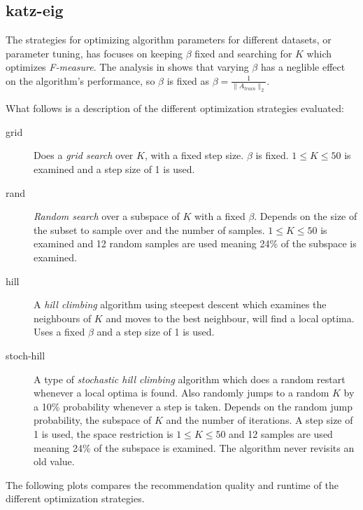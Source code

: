 
\subsection{katz-eig}\label{sec:opt:katzeig}

The strategies for optimizing algorithm parameters for different datasets, or parameter tuning, has focuses on keeping $\beta$ fixed and searching for $K$ which optimizes \textit{F-measure}. The analysis in  shows that varying $\beta$ has a neglible effect on the algorithm's performance, so $\beta$ is fixed as $\beta = \frac{1}{\|A_{train}\|_2}$.

What follows is a description of the different optimization strategies evaluated:

\begin{description}
    \item[grid]
        Does a \textit{grid search} over $K$, with a fixed step size. $\beta$ is fixed. $1 \leq K \leq 50$ is examined and a step size of 1 is used.
    \item[rand]
        \textit{Random search} over a subspace of $K$ with a fixed $\beta$. Depends on the size of the subset to sample over and the number of samples. $1 \leq K \leq 50$ is examined and 12 random samples are used meaning 24\% of the subspace is examined.
    \item[hill]
        A \textit{hill climbing} algorithm using steepest descent which examines the neighbours of $K$ and moves to the best neighbour, will find a local optima. Uses a fixed $\beta$ and a step size of 1 is used.
    \item[stoch-hill]
        A type of \textit{stochastic hill climbing} algorithm which does a random restart whenever a local optima is found. Also randomly jumps to a random $K$ by a 10\% probability whenever a step is taken. Depends on the random jump probability, the subspace of $K$ and the number of iterations. A step size of 1 is used, the space restriction is $1 \leq K \leq 50$ and 12 samples are used meaning 24\% of the subspace is examined. The algorithm never revisits an old value.
\end{description}

The following plots compares the recommendation quality and runtime of the different optimization strategies.


